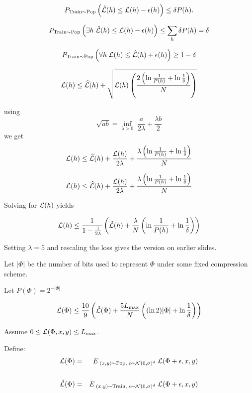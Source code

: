 {

$$P_{\mathrm{Train} \sim \mathrm{Pop}}\left(\hat{{\cal L}}(h) \leq {\cal L}(h) - \epsilon(h)\right) \leq \delta P(h).$$

\vfill
$$P_{\mathrm{Train} \sim \mathrm{Pop}}\left(\exists h\;\hat{{\cal L}}(h) \leq {\cal L}(h) - \epsilon(h)\right) \leq \sum_h \delta P(h) =\delta$$

\vfill
$$P_{\mathrm{Train} \sim \mathrm{Pop}}\left(\forall h\;{\cal L}(h) \leq \hat{{\cal L}}(h) + \epsilon(h)\right) \geq 1- \delta$$


$${\cal L}(h) \leq \widehat{{\cal L}}(h) + \sqrt{{\cal L}(h)\left(\frac{2\left(\ln\frac{1}{P(h)} + \ln\frac{1}{\delta}\right)}{N}\right)}$$

using
$$\sqrt{ab} = \inf_{\lambda > 0}\;\frac{a}{2\lambda} + \frac{\lambda b}{2}$$
\vfill
we get
$${\cal L}(h) \leq \widehat{{\cal L}}(h) + \frac{{\cal L}(h)}{2\lambda} + \frac{\lambda\left(\ln\frac{1}{P(h)} + \ln\frac{1}{\delta}\right)}{N}$$

$${\cal L}(h) \leq \widehat{{\cal L}}(h) + \frac{{\cal L}(h)}{2\lambda} + \frac{\lambda\left(\ln\frac{1}{P(h)} + \ln\frac{1}{\delta}\right)}{N}$$

\vfill
Solving for ${\cal L}(h)$ yields

\vfill
$${\cal L}(h) \leq \frac{1}{1-\frac{1}{2\lambda}}\left(\hat{{\cal L}}(h) + \frac{\lambda}{N}\left(\ln \frac{1}{P(h)} + \ln \frac{1}{\delta}\right)\right)$$

\vfill
Setting $\lambda = 5$ and rescaling the loss gives the version on earlier slides.


Let $|\Phi|$ be the number of bits used to represent $\Phi$ under some fixed compression scheme.

\vfill
Let $P(\Phi) = 2^{-|\Phi|}$

\vfill
    $${\cal L}(\Phi) \leq \frac{10}{9}\left(\hat{\cal L}(\Phi) + \frac{5 L_\mathrm{max}}{N}\left((\ln 2)|\Phi| + \ln\frac{1}{\delta}\right)\right)$$


Assume $0 \leq {\cal L}(\Phi,x,y) \leq L_{\max}$.

\vfill
Define:
\begin{eqnarray*}
{\cal L}(\Phi) & = & E_{\;(x,y)\sim \mathrm{Pop},\;\epsilon \sim {\cal N}(0,\sigma)^d}\;{{\cal L}(\Phi+\epsilon,x,y)} \\
\\
\hat{{\cal L}}(\Phi) & = & E_{\;(x,y)\sim \mathrm{Train},\;\epsilon \sim {\cal N}(0,\sigma)^d}\;{{\cal L}(\Phi+\epsilon,x,y)} \\
\end{eqnarray*}

}
